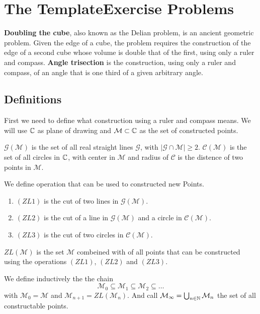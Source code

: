 \documentclass{../Proof_layout_PDF/TemplateExercise}
\begin{document}
\section{The TemplateExercise Problems}
\textbf{Doubling the cube}, also known as the Delian problem, is an ancient geometric problem.
Given the edge of a cube, the problem requires the construction of the edge of a second cube whose volume is double that of the first,
using only a ruler and compass.
\newline
\textbf{Angle trisection} is the construction, using only a ruler and compass, of an angle that is one third of a given arbitrary angle.

\subsection{Definitions}
First we need to define what construction using a ruler and compass means.
We will use $\mathbb{C}$ as plane of drawing and $\mathcal{M} \subset \mathbb{C}$ as the set of constructed points.
\begin{definition}
    $\mathcal{G(M)}$ is the set of all real straight lines $\mathcal{G}$, with $| \mathcal{G} \cap \mathcal{M} |\ge 2$.\newline
    $\mathcal{C(M)}$ is the set of all circles in $\mathbb{C}$, with center in $\mathcal{M}$ and radius of $\mathcal{C}$ is the distence of two points in $\mathcal{M}$.
\end{definition}

\begin{definition}
    We define operation that can be used to constructed new Points.
    \begin{enumerate}
        \item $(ZL 1)$ is the cut of two lines in $\mathcal{G(M)}$.
        \item $(ZL 2)$ is the cut of a line in $\mathcal{G(M)}$ and a circle in $\mathcal{C(M)}$. \newline
        \item $(ZL 3)$ is the cut of two circles in $\mathcal{C(M)}$.\newline
    \end{enumerate}
    $ZL(\mathcal{M})$ is the set $\mathcal{M}$ combeined with of all points that can be constructed using the operations $(ZL 1)$, $(ZL 2)$ and $(ZL 3)$.
\end{definition}

\begin{definition}
    We define inductively the the chain
    \begin{equation*}
        \mathcal{M}_0 \subseteq \mathcal{M}_1 \subseteq \mathcal{M}_2 \subseteq \dots
    \end{equation*}
    with $\mathcal{M}_0 = \mathcal{M}$ and $\mathcal{M}_{n+1} = ZL(\mathcal{M}_n)$.\newline
    And call $\mathcal{M}_{\infty} = \bigcup_{n \in \mathbb{N}} \mathcal{M}_n$ the set of all constructable points.
\end{definition}
\end{document}
